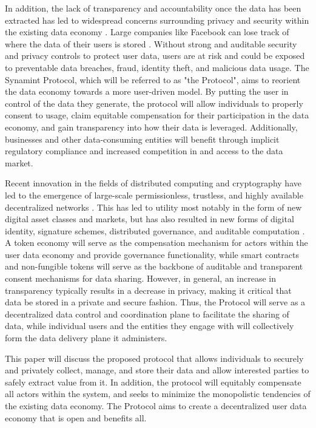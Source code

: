 In addition, the lack of transparency and accountability once the data has been extracted has led to widespread concerns surrounding privacy and security within the 
existing data economy \cite{auxier_americans_2019}\cite{ConsolitdationWeb}. Large companies like Facebook can lose track of where the data of their users is stored 
\cite{FacebookDoesntKnow}. Without strong and auditable security and privacy controls to protect user data, users are at risk and could be exposed to preventable data 
breaches, fraud, identity theft, and malicious data usage. The Synamint Protocol, which will be referred to as "the Protocol", aims to reorient the data economy towards a more user-driven model. By putting 
the user in control of the data they generate, the protocol will allow individuals to properly consent to usage, claim equitable compensation for their participation 
in the data economy, and gain transparency into how their data is leveraged. Additionally, businesses and other data-consuming entities will benefit through implicit 
regulatory compliance and increased competition in and access to the data market.

Recent innovation in the fields of distributed computing and cryptography have led to the emergence of large-scale permissionless, trustless, and highly available 
decentralized networks \cite{SANTANA2022121806}. This has led to utility most notably in the form of new digital asset classes and markets, but has also resulted 
in new forms of digital identity, signature schemes, distributed governance, and auditable computation \cite{Politou2022}. A token economy will serve as the 
compensation mechanism for actors within the user data economy and provide governance functionality, while smart contracts and non-fungible tokens will serve as 
the backbone of auditable and transparent consent mechanisms for data sharing. However, in general, an increase in transparency typically results in a decrease 
in privacy, making it critical that data be stored in a private and secure fashion. Thus, the Protocol will serve as a decentralized data control and coordination 
plane to facilitate the sharing of data, while individual users and the entities they engage with will collectively form the data delivery plane it administers. 

This paper will discuss the proposed protocol that allows individuals to securely and privately collect, manage, and store their data and allow interested parties 
to safely extract value from it. In addition, the protocol will equitably compensate all actors within the system, and seeks to minimize the monopolistic tendencies 
of the existing data economy. The Protocol aims to create a decentralized user data economy that is open and benefits all.